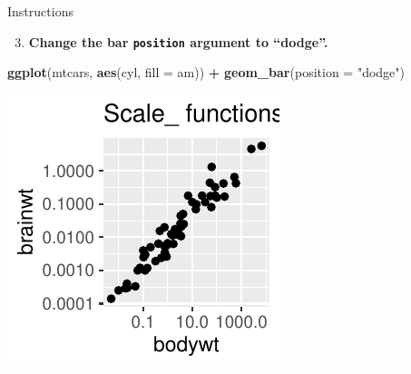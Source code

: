 \documentclass[
  ignorenonframetext,
]{beamer}
\newenvironment{Shaded}{\begin{snugshade}}{\end{snugshade}}
\newcommand{\AttributeTok}[1]{\textcolor[rgb]{0.13,0.29,0.53}{#1}}
\newcommand{\FunctionTok}[1]{\textcolor[rgb]{0.13,0.29,0.53}{\textbf{#1}}}
\newcommand{\NormalTok}[1]{#1}
\newcommand{\SpecialCharTok}[1]{\textcolor[rgb]{0.81,0.36,0.00}{\textbf{#1}}}
\newcommand{\StringTok}[1]{\textcolor[rgb]{0.31,0.60,0.02}{#1}}
\providecommand{\tightlist}{%
  \setlength{\itemsep}{0pt}\setlength{\parskip}{0pt}}
\begin{document}
\begin{frame}[fragile]{Instructions}
\label{instructions-5}
\begin{enumerate}
\setcounter{enumi}{2}
\tightlist
\item
  \textbf{Change the bar \texttt{position} argument to ``dodge''.}
\end{enumerate}


\begin{Shaded}
\begin{Highlighting}[]
\FunctionTok{ggplot}\NormalTok{(mtcars, }\FunctionTok{aes}\NormalTok{(cyl, }\AttributeTok{fill =}\NormalTok{ am)) }\SpecialCharTok{+} \FunctionTok{geom\_bar}\NormalTok{(}\AttributeTok{position =} \StringTok{"dodge"}\NormalTok{)}
\end{Highlighting}
\end{Shaded}

\begin{center}\includegraphics[width=0.5\linewidth]{Figs/unnamed-chunk-49-1} \end{center}
\end{frame}
\end{document}
